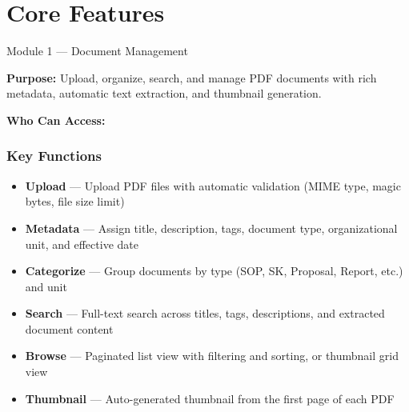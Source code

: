 \section{Core Features}

\begin{ugModule}{Module 1 --- Document Management}

  \textbf{Purpose:}
  Upload, organize, search, and manage PDF documents with rich
  metadata, automatic text extraction, and thumbnail generation.

  \textbf{Who Can Access:}
    

  \subsubsection*{Key Functions}
  \begin{itemize}[leftmargin=18pt]
    \item \textbf{Upload} --- Upload PDF files with automatic
      validation (MIME type, magic bytes, file size limit)
    \item \textbf{Metadata} --- Assign title, description, tags,
      document type, organizational unit, and effective date
    \item \textbf{Categorize} --- Group documents by type
      (SOP, SK, Proposal, Report, etc.) and unit
    \item \textbf{Search} --- Full-text search across titles,
      tags, descriptions, and extracted document content
    \item \textbf{Browse} --- Paginated list view with filtering
      and sorting, or thumbnail grid view
    \item \textbf{Thumbnail} --- Auto-generated thumbnail from
      the first page of each PDF
  \end{itemize}


\end{ugModule}
